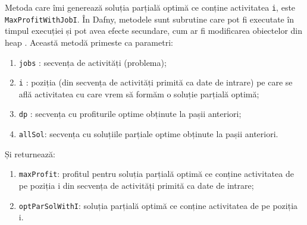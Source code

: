 Metoda care îmi generează soluția parțială optimă ce conține activitatea \texttt{i}, este \\\texttt{MaxProfitWithJobI}. În Dafny, metodele sunt subrutine care pot fi executate în timpul execuției și pot avea efecte secundare, cum ar fi modificarea obiectelor din heap \cite{DBLP:journals/jlap/BlazquezMS23}.
Această metodă primeste ca parametri: 
\begin{enumerate}
    \item \texttt{jobs} : secvența de activități (problema);
    \item \texttt{i} : poziția (din secvența de activități primită ca date de intrare) pe care se află activitatea cu care vrem să formăm o soluție parțială optimă;  
    \item \texttt{dp} : secvența cu profiturile optime obținute la pașii anteriori;
    \item \texttt{allSol}: secvența cu soluțiile parțiale optime obținute la pașii anteriori.
\end{enumerate}
Și returnează:
\begin{enumerate}
    \item \texttt{maxProfit}: profitul pentru soluția parțială optimă ce conține activitatea de pe poziția i din secvența de activități primită ca date de intrare;
    \item \texttt{optParSolWithI}: soluția parțială optimă ce conține activitatea de pe poziția i.
\end{enumerate}
